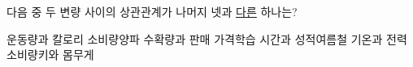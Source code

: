 다음 중 두 변량 사이의 상관관계가 나머지 넷과 \underline{다른} 하나는?
\begin{choicesv}{운동량과 칼로리 소비량}{양파 수확량과 판매 가격}{학습 시간과 성적}{여름철 기온과 전력 소비량}{키와 몸무게}\end{choicesv}
